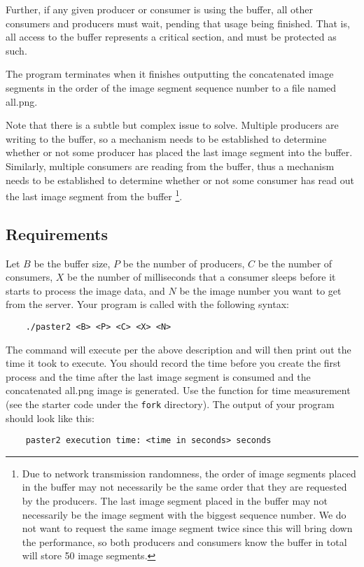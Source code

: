Further, if any given producer or consumer is using the buffer, all other consumers and producers must wait, pending that usage being finished.  That is, all access to the buffer represents a critical section, and must be protected as such.

The program terminates when it finishes outputting the concatenated image segments in the order of the image segment sequence number to a file named all.png.

Note that there is a subtle but complex issue to solve. Multiple producers are writing to the buffer, so a mechanism needs to be established to determine whether or not some producer has placed the last image segment into the buffer. Similarly, multiple consumers are reading from the buffer, thus a mechanism needs to be established to determine whether or not some consumer has read out the last image segment from the buffer
\footnote{Due to network transmission randomness, the order of image segments placed in the buffer may not necessarily be the same order that they are requested by the producers. The last image segment placed in the buffer may not necessarily be the image segment with the biggest sequence number. We do not want to request the same image segment twice since this will bring down the performance, so both producers and consumers know the buffer in total will store 50 image segments.}. 

\subsection*{Requirements}

Let
$B$ be the buffer size,  
$P$ be the number of producers,
$C$ be the number of consumers,
$X$ be the number of milliseconds that a consumer sleeps before it starts to process the image data, and
$N$ be the image number you want to get from the server.
Your program is called with the following syntax:
\begin{verbatim}
    ./paster2 <B> <P> <C> <X> <N>
\end{verbatim}

The command will execute per the above description and will then print out the time it took to execute. You should record the time before you create the first process and the time after the last image segment is consumed and the concatenated all.png image is generated. Use the  function for time measurement (see the starter code under the \verb+fork+ directory). 
The output of your program should look like this:
\begin{verbatim}
    paster2 execution time: <time in seconds> seconds
\end{verbatim}


